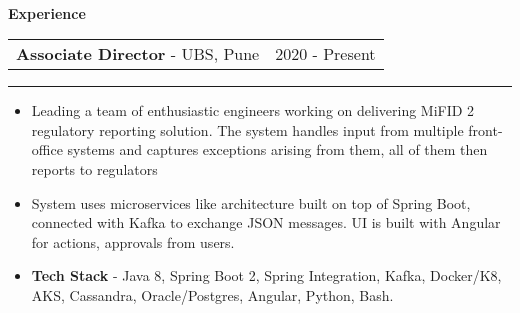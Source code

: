 \documentclass[10pt,A4]{article}
\newcommand{\cvsection}[1]
{
	\begin{center}
		\large\textcolor{sectcol}{\textbf{#1}}
	\end{center}
}
\newcommand{\cvevent}[4]
{

\begin{tabular*}{1\textwidth}{p{13.6cm}  x{3.9cm}}
	\textbf{#2} - \textcolor{bgcol}{#3} &   \vspace{2.0pt}\textcolor{sectcol}{#1}
\end{tabular*}

\vspace{-8pt}
\textcolor{softcol}{\hrule}
\vspace{6pt}

  #4 

}
\begin{document}
\ \\
%
%

\cvsection{Experience}

\cvevent{2020 - Present}
{Associate Director}
{UBS, Pune}
{
\begin{itemize}

\item	Leading a team of enthusiastic engineers working on delivering MiFID 2 regulatory reporting solution. 
	The system handles input from multiple front-office systems and captures exceptions arising from them, all of them then reports to regulators
	
\item	System uses microservices like architecture built on top of Spring Boot, connected with Kafka to exchange JSON messages. 
	UI is built with Angular for actions, approvals from users.
		
\item \textbf{Tech Stack} - Java 8, Spring Boot 2, Spring Integration, Kafka, Docker/K8, AKS, Cassandra, Oracle/Postgres, Angular, Python, Bash.

\end{itemize}

}

\ \\ \\
\end{document}
